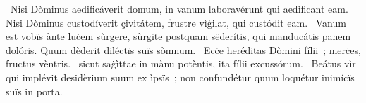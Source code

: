 ~Nisi Dòminus aedificáverit domum, in vanum laboravérunt qui aedìficant eam. Nisi Dòminus custodíverit çivitátem, frustre vìġilat, qui custódit eam. 
~Vanum est vobïs ànte luċem sùrgere, sùrgite postquam sëderítis, qui manducátis panem dolóris. Quum dèderit diléctïs suïs sòmnum. 
~Ecċe heréditas Dòmini fílii~; merċes, fructus vèntris. 
~sicut saġìttae in mànu potèntis, ita fílii excussórum. 
~Beátus vìr qui implévit desidèrium suum ex ìpsïs~; non confundétur quum loquétur inimícïs suïs in porta. 

